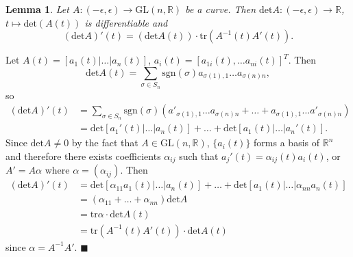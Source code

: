\documentclass[letter-paper]{tufte-book}
\newtheorem{lemma}[theorem]{\color{pastel-blue}Lemma}
\newenvironment{proof}[1][Proof]{\begin{trivlist}
\item[\hskip \labelsep {\bfseries #1}]}{\end{trivlist}}
\newcommand{\qed}{\hfill$\blacksquare$}
\begin{document}
\begin{lemma}
  Let $A: (-\epsilon, \epsilon) \to \mbox{GL}(n,\mathbb{R})$ be a curve. Then $\mbox{det}A : (-\epsilon, \epsilon) \to \mathbb{R}$, $t \mapsto \mbox{det}(A(t))$ is differentiable and
  \begin{equation*}
    \left(\mbox{det}A\right)'(t) = \left(\mbox{det}A(t)\right) \cdot \mbox{tr}\left(A^{-1}(t)A'(t)\right).
  \end{equation*}
\end{lemma}
\begin{proof}
  Let $A(t) = [a_1(t)|\ldots|a_n(t)]$, $a_i(t) = [a_{1i}(t), \ldots a_{ni}(t)]^T$. Then
  \begin{equation*}
    \mbox{det}A(t) = \sum_{\sigma\in S_n}\mbox{sgn}(\sigma) a_{\sigma(1),1}\ldots a_{\sigma(n)n},
  \end{equation*}
  so
  \begin{align*}
    \left(\mbox{det}A\right)'(t) &= \sum_{\sigma\in S_n}\mbox{sgn}(\sigma)\left(a'_{\sigma(1),1}\ldots a_{\sigma(n)n} + \ldots + a_{\sigma(1),1}\ldots a'_{\sigma(n)n}\right)\\
      &= \mbox{det}[a_1'(t)|\ldots|a_n(t)] + \ldots + \mbox{det}[a_1(t)|\ldots|a_n'(t)].
  \end{align*}
  Since $\mbox{det}A \neq 0$ by the fact that $A\in \mbox{GL}(n, \mathbb{R})$, $\{a_i(t)\}$ forms a basis of $\mathbb{R}^n$ and therefore there exists coefficients $\alpha_{ij}$ such that $a_j'(t) = \alpha_{ij}(t)a_i(t)$, or $A' = A\alpha$ where $\alpha = (\alpha_{ij})$. Then
  \begin{align*}
    \left(\mbox{det}A\right)'(t) &= \mbox{det}[\alpha_{11}a_1(t)|\ldots|a_n(t)] + \ldots + \mbox{det}[a_1(t)|\ldots|\alpha_{nn}a_n(t)]\\
      &= (\alpha_{11} + \ldots + \alpha_{nn}) \mbox{det}A\\
      &= \mbox{tr}\alpha \cdot \mbox{det}A(t)\\
      &= \mbox{tr}\left(A^{-1}(t)A'(t)\right) \cdot \mbox{det}A(t)
  \end{align*}
  since $\alpha = A^{-1}A'$. \qed
\end{proof}
\end{document}
